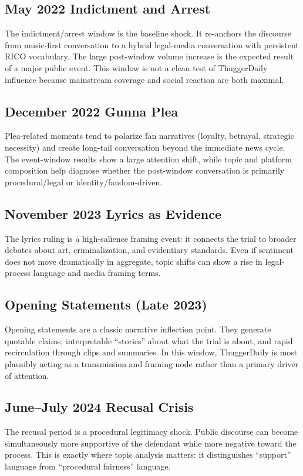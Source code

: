 \documentclass[12pt]{article}
\begin{document}
\subsection{May 2022 Indictment and Arrest}
The indictment/arrest window is the baseline shock. It re-anchors the discourse from music-first conversation to a hybrid legal-media conversation with persistent RICO vocabulary. The large post-window volume increase is the expected result of a major public event. This window is not a clean test of ThuggerDaily influence because mainstream coverage and social reaction are both maximal.

\subsection{December 2022 Gunna Plea}
Plea-related moments tend to polarize fan narratives (loyalty, betrayal, strategic necessity) and create long-tail conversation beyond the immediate news cycle. The event-window results show a large attention shift, while topic and platform composition help diagnose whether the post-window conversation is primarily procedural/legal or identity/fandom-driven.

\subsection{November 2023 Lyrics as Evidence}
The lyrics ruling is a high-salience framing event: it connects the trial to broader debates about art, criminalization, and evidentiary standards. Even if sentiment does not move dramatically in aggregate, topic shifts can show a rise in legal-process language and media framing terms.

\subsection{Opening Statements (Late 2023)}
Opening statements are a classic narrative inflection point. They generate quotable claims, interpretable ``stories'' about what the trial is about, and rapid recirculation through clips and summaries. In this window, ThuggerDaily is most plausibly acting as a transmission and framing node rather than a primary driver of attention.

\subsection{June--July 2024 Recusal Crisis}
The recusal period is a procedural legitimacy shock. Public discourse can become simultaneously more supportive of the defendant while more negative toward the process. This is exactly where topic analysis matters: it distinguishes ``support'' language from ``procedural fairness'' language.
\end{document}
